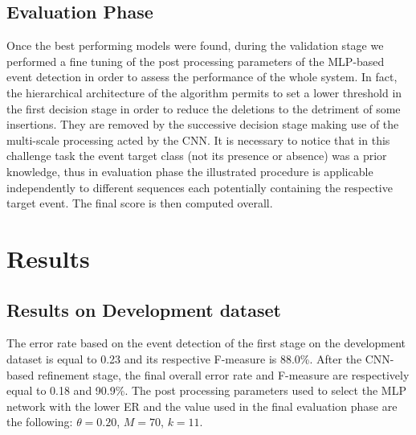 \documentclass{article}
\begin{document}
\begin{sloppy}
\subsection{Evaluation Phase}
\label{sec:Evaluation_Phase}
Once the best performing models were found, during the validation stage we performed a fine tuning of the post processing parameters of the MLP-based event detection in order to assess the performance of the whole system. In fact, the hierarchical architecture of the algorithm permits to set a lower threshold in the first decision stage in order to reduce the deletions to the detriment of some insertions. They are removed by the successive decision stage making use of the multi-scale processing acted by the CNN. 
It is necessary to notice that in this challenge task the event target class (not its presence or absence) was a prior knowledge, thus in evaluation phase the illustrated procedure is applicable independently to different sequences each potentially containing the respective target event. The final score is then computed overall.

\section{Results}
\label{sec:results}
\subsection{Results on Development dataset}
The error rate based on the event detection of the first stage on the development dataset is equal to 0.23 and its respective F-measure is 88.0\%. 
After the CNN-based refinement stage, the final overall error rate and F-measure are respectively equal to 0.18 and 90.9\%. 
The post processing parameters used to select the MLP network with the lower ER and the value used in the final evaluation phase are the following:
$\theta=0.20$, $M=70$, $k=11$. 


\end{sloppy}
\end{document}

